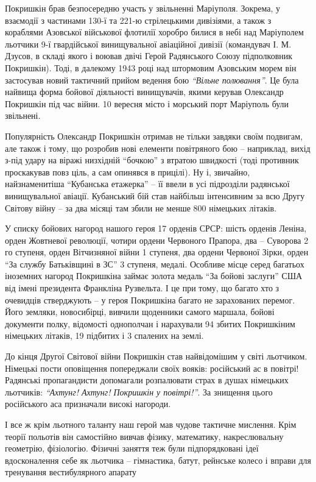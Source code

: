 Покришкін брав безпосередню участь у звільненні Маріуполя. Зокрема, у взаємодії
з частинами 130-ї та 221-ю стрілецькими дивізіями, а також з кораблями
Азовської військової флотилії хоробро билися в небі над Маріуполем льотчики 9-ї
гвардійської винищувальної авіаційної дивізії (командувач І. М. Дзусов, в
складі якого і  воював двічі Герой Радянського Союзу підполковник Покришкін).
Тоді, в далекому 1943 році над штормовим Азовським морем він застосував новий
тактичний прийом ведення бою \emph{\enquote{Вільне полювання}}. Це була найвища форма бойової
діяльності винищувачів, якими керував Олександр Покришкін під час війни. 10
вересня місто і морський порт Маріуполь були звільнені.

Популярність Олександр Покришкін отримав не тільки завдяки своїм подвигам, але
також і тому, що розробив нові елементи повітряного бою – наприклад, вихід
з-під удару на віражі низхідній \enquote{бочкою} з втратою швидкості (тоді противник
проскакував повз ціль, а сам опинявся в прицілі). Ну і, звичайно,
найзнаменитіша \enquote{Кубанська етажерка}  – її ввели в усі підрозділи радянської
винищувальної авіації. Кубанський бій став найбільш інтенсивним за всю Другу
Світову війну –  за два місяці там збили не менше 800 німецьких літаків.

У списку бойових нагород нашого героя 17 орденів СРСР: шість орденів Леніна,
орден Жовтневої революції, чотири ордени Червоного Прапора, два –  Суворова 2
го ступеня, орден Вітчизняної війни 1 ступеня, два ордени Червоної Зірки, орден
\enquote{За службу Батьківщині в ЗС} 3 ступеня, медалі. Особливе місце серед багатьох
іноземних нагород Покришкіна займає золота медаль \enquote{За бойові заслуги} США від
імені президента Франкліна Рузвельта. І це при тому, що багато хто з очевидців
стверджують – у героя Покришкіна багато не зарахованих перемог. Його земляки,
новосибірці, вивчили щоденники самого маршала, бойові документи полку,
відомості однополчан і нарахували 94 збитих Покришкіним німецьких літаків, 19
підбитих і 3 спалених на землі.

До кінця Другої Світової війни Покришкін став найвідомішим у світі льотчиком.
Німецькі пости оповіщення попереджали своїх вояків: російський ас в повітрі!
Радянські пропагандисти допомагали розпалювати страх в душах німецьких
льотчиків: \emph{\enquote{Ахтунг! Ахтунг! Покришкін у повітрі!}}. За знищення
цього російського аса призначали високі нагороди.

І все ж крім льотного таланту наш герой мав чудове тактичне мислення.  Крім
теорії польотів він самостійно вивчав фізику, математику, накреслювальну
геометрію, фізіологію. Фізичні заняття теж були підпорядковані ідеї
вдосконалення себе як льотчика –  гімнастика, батут, рейнське колесо і вправи
для тренування вестибулярного апарату

